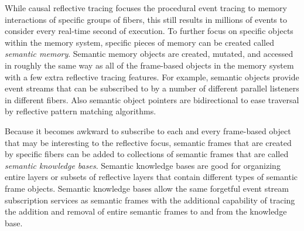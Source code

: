 While causal reflective tracing focuses the procedural event tracing
to memory interactions of specific groups of fibers, this still
results in millions of events to consider every real-time second of
execution.  To further focus on specific objects within the memory
system, specific pieces of memory can be created called
{\emph{semantic memory}}.  Semantic memory objects are created,
mutated, and accessed in roughly the same way as all of the
frame-based objects in the memory system with a few extra reflective
tracing features.  For example, semantic objects provide event streams
that can be subscribed to by a number of different parallel listeners
in different fibers.  Also semantic object pointers are bidirectional
to ease traversal by reflective pattern matching algorithms.

Because it becomes awkward to subscribe to each and every frame-based
object that may be interesting to the reflective focus, semantic
frames that are created by specific fibers can be added to collections
of semantic frames that are called {\emph{semantic knowledge bases}}.
Semantic knowledge bases are good for organizing entire layers or
subsets of reflective layers that contain different types of semantic
frame objects.  Semantic knowledge bases allow the same forgetful
event stream subscription services as semantic frames with the
additional capability of tracing the addition and removal of entire
semantic frames to and from the knowledge base.


